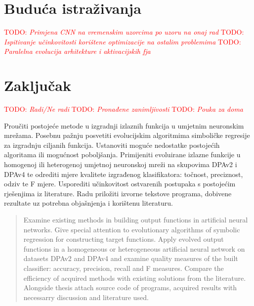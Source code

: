 \documentclass[times, utf8, diplomski]{fer}
\def\TODO#1{\noindent\textcolor{red}{TODO: \textit{#1}}\newline}
\def\todo#1{\TODO{#1}}
\begin{document}
\chapter{Buduća istraživanja}
\todo{Primjena CNN na vremenskim uzorcima po uzoru na onaj rad}
\todo{Ispitivanje učinkovitosti korištene optimizacije na ostalim problemima}
\todo{Paralelna evolucija arhitekture i aktivacijskih fja \citep{cnn_evolution}}

\chapter{Zaključak}
\todo{Radi/Ne radi}
\todo{Pronađene zanimljivosti}
\todo{Pouka za doma}




\begin{sazetak}
Proučiti postojeće metode u izgradnji izlaznih funkcija u umjetnim neuronskim mrežama. Posebnu pažnju posvetiti evolucijskim algoritmima simboličke regresije za izgradnju ciljanih funkcija. Ustanoviti moguće nedostatke postojećih algoritama ili mogućnost poboljšanja. Primijeniti evoluirane izlazne funkcije u homogenoj ili heterogenoj umjetnoj neuronskoj mreži na skupovima DPAv2 i DPAv4 te odrediti mjere kvalitete izgrađenog klasifikatora: točnost, preciznost, odziv te F mjere. Usporediti učinkovitost ostvarenih postupaka s postojećim rješenjima iz literature. Radu priložiti izvorne tekstove programa, dobivene rezultate uz potrebna objašnjenja i korištenu literaturu.

\end{sazetak}

\begin{abstract}
Examine existing methods in building output functions in artificial neural networks. Give special attention to evolutionary algorithms of symbolic regression for constructing target functions. Apply evolved output functions in a homogeneous or heterogeneous artificial neural network on datasets DPAv2 and DPAv4 and examine quality measures of the built classifier: accuracy, precision, recall and F measures. Compare the efficiency of acquired methods with existing solutions from the literature. Alongside thesis attach source code of programs, acquired results with necessarry discussion and literature used.

\end{abstract}
\end{document}
